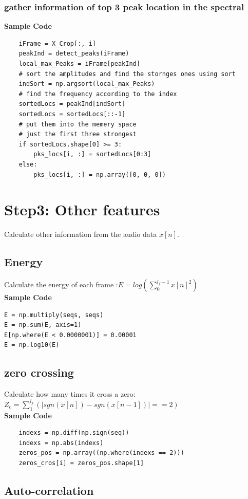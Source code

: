 \documentclass[twoside]{article}
\begin{document}
\subsubsection{gather information of top 3 peak location in the spectral}
\textbf{Sample Code}
\begin{lstlisting}
    iFrame = X_Crop[:, i]
    peakInd = detect_peaks(iFrame)
    local_max_Peaks = iFrame[peakInd]
    # sort the amplitudes and find the stornges ones using sort
    indSort = np.argsort(local_max_Peaks)
    # find the frequency according to the index
    sortedLocs = peakInd[indSort]
    sortedLocs = sortedLocs[::-1]
    # put them into the memery space
    # just the first three strongest
    if sortedLocs.shape[0] >= 3:
        pks_locs[i, :] = sortedLocs[0:3]
    else:
        pks_locs[i, :] = np.array([0, 0, 0])
\end{lstlisting}


\section{Step3: Other features}
Calculate other information from the audio data $x[n]$.
\subsection{Energy}
Calculate the energy of each frame :$E = log (\displaystyle \sum_{0}^{l_f - 1} x[n]^2)$\\ 
\textbf{Sample Code}
\begin{lstlisting}
E = np.multiply(seqs, seqs)
E = np.sum(E, axis=1)
E[np.where(E < 0.0000001)] = 0.00001
E = np.log10(E)
\end{lstlisting}

\subsection{zero crossing}
Calculate how many times it cross a zero:$Z_c = \displaystyle \sum_{1}^{l_f} (|sgn(x[n]) - sgn(x[n-1])| == 2)$\\
\textbf{Sample Code}
\begin{lstlisting}
    indexs = np.diff(np.sign(seq))
    indexs = np.abs(indexs)
    zeros_pos = np.array((np.where(indexs == 2)))
    zeros_cros[i] = zeros_pos.shape[1]
\end{lstlisting}


\subsection{Auto-correlation}
\end{document}
